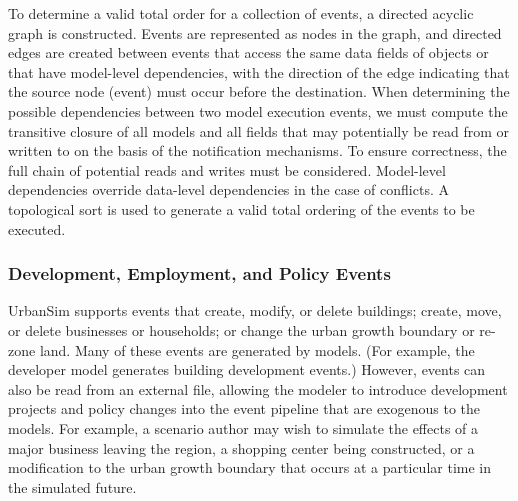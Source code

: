 To determine a valid total order for a collection of events, a
directed acyclic graph is constructed.  Events are represented as
nodes in the graph, and directed edges are created between events
that access the same data fields of objects or that have
model-level dependencies, with the direction of the edge
indicating that the source node (event) must occur before the
destination.  When determining the possible dependencies between
two model execution events, we must compute the transitive closure
of all models and all fields that may potentially be read from or
written to on the basis of the notification mechanisms. To ensure
correctness, the full chain of potential reads and writes must be
considered. Model-level dependencies override data-level
dependencies in the case of conflicts.  A topological sort is used
to generate a valid total ordering of the events to be executed.

\subsubsection{Development, Employment, and Policy Events}
\label{sec:DevPolicyEvents}

UrbanSim supports events that create, modify, or delete buildings;
create, move, or delete businesses or households; or change the
urban growth boundary or re-zone land. Many of these events are
generated by models.  (For example, the developer model generates
building development events.)  However, events can also be read
from an external file, allowing the modeler to introduce
development projects and policy changes into the event pipeline
that are exogenous to the models.  For example, a scenario author
may wish to simulate the effects of a major business leaving the
region, a shopping center being constructed, or a modification to
the urban growth boundary that occurs at a particular 
time in the simulated future.


